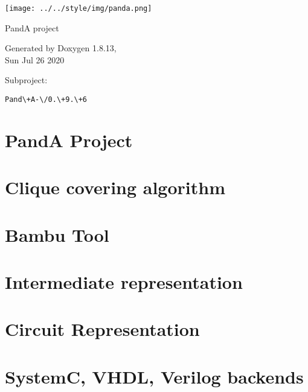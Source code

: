 \documentclass[a4paper]{book}
\begin{document}
\begin{titlepage}
\vspace*{5cm}
\begin{center}
\mbox{\texttt{[image: ../../style/img/panda.png]}}
\end{center}
\vspace*{2cm}
\begin{center}
\Large{PandA project}
 
\vspace*{1cm}
{\large Generated by Doxygen 1.8.13,}\\
\vspace*{0.5cm}
{\small Sun Jul 26 2020}\\
\end{center}
\vspace*{2cm}
{\large Subproject:}
\begin{verbatim}
Pand\+A-\/0.\+9.\+6
\end{verbatim}

\end{titlepage}
\clearemptydoublepage
{}
\tableofcontents
\clearemptydoublepage
{}
\chapter{PandA Project}
\label{index}\hypertarget{index}{}
\chapter{Clique covering algorithm}
\label{src_algorithms_cliquecovering}

\chapter{Bambu Tool}
\label{src_bambu}

\chapter{Intermediate representation}
\label{src_behavior_page}

\chapter{Circuit Representation}
\label{src_circuit_page}

\chapter{SystemC, V\+H\+DL, Verilog backends}
\label{src_backend_ToHDL_page}

\end{document}
